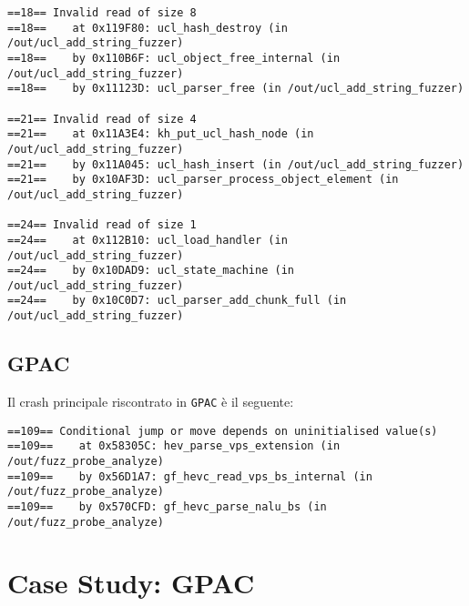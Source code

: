 \begin{verbatim}
==18== Invalid read of size 8
==18==    at 0x119F80: ucl_hash_destroy (in /out/ucl_add_string_fuzzer)
==18==    by 0x110B6F: ucl_object_free_internal (in /out/ucl_add_string_fuzzer)
==18==    by 0x11123D: ucl_parser_free (in /out/ucl_add_string_fuzzer)

==21== Invalid read of size 4
==21==    at 0x11A3E4: kh_put_ucl_hash_node (in /out/ucl_add_string_fuzzer)
==21==    by 0x11A045: ucl_hash_insert (in /out/ucl_add_string_fuzzer)
==21==    by 0x10AF3D: ucl_parser_process_object_element (in /out/ucl_add_string_fuzzer)

==24== Invalid read of size 1
==24==    at 0x112B10: ucl_load_handler (in /out/ucl_add_string_fuzzer)
==24==    by 0x10DAD9: ucl_state_machine (in /out/ucl_add_string_fuzzer)
==24==    by 0x10C0D7: ucl_parser_add_chunk_full (in /out/ucl_add_string_fuzzer)
\end{verbatim}

\subsection{GPAC}
Il crash principale riscontrato in \texttt{GPAC} è il seguente:

\begin{verbatim}
==109== Conditional jump or move depends on uninitialised value(s)
==109==    at 0x58305C: hev_parse_vps_extension (in /out/fuzz_probe_analyze)
==109==    by 0x56D1A7: gf_hevc_read_vps_bs_internal (in /out/fuzz_probe_analyze)
==109==    by 0x570CFD: gf_hevc_parse_nalu_bs (in /out/fuzz_probe_analyze)
\end{verbatim}

\section{Case Study: GPAC}
